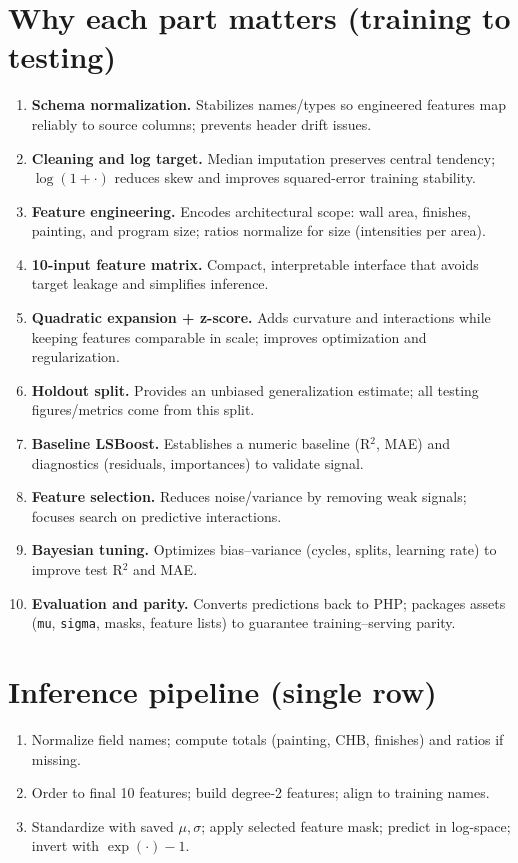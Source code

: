 \documentclass[11pt]{article}
\begin{document}
\section*{Why each part matters (training to testing)}
\begin{enumerate}[label=Part~\arabic*:, leftmargin=*]
  \item \textbf{Schema normalization.} Stabilizes names/types so engineered features map reliably to source columns; prevents header drift issues.
  \item \textbf{Cleaning and log target.} Median imputation preserves central tendency; $\log(1+\cdot)$ reduces skew and improves squared-error training stability.
  \item \textbf{Feature engineering.} Encodes architectural scope: wall area, finishes, painting, and program size; ratios normalize for size (intensities per area).
  \item \textbf{10-input feature matrix.} Compact, interpretable interface that avoids target leakage and simplifies inference.
  \item \textbf{Quadratic expansion + z-score.} Adds curvature and interactions while keeping features comparable in scale; improves optimization and regularization.
  \item \textbf{Holdout split.} Provides an unbiased generalization estimate; all testing figures/metrics come from this split.
  \item \textbf{Baseline LSBoost.} Establishes a numeric baseline (R$^2$, MAE) and diagnostics (residuals, importances) to validate signal.
  \item \textbf{Feature selection.} Reduces noise/variance by removing weak signals; focuses search on predictive interactions.
  \item \textbf{Bayesian tuning.} Optimizes bias–variance (cycles, splits, learning rate) to improve test R$^2$ and MAE.
  \item \textbf{Evaluation and parity.} Converts predictions back to PHP; packages assets (\verb|mu|, \verb|sigma|, masks, feature lists) to guarantee training–serving parity.
\end{enumerate}

\section*{Inference pipeline (single row)}
\begin{enumerate}
  \item Normalize field names; compute totals (painting, CHB, finishes) and ratios if missing.
  \item Order to final 10 features; build degree-2 features; align to training names.
  \item Standardize with saved $\mu,\sigma$; apply selected feature mask; predict in log-space; invert with $\exp(\cdot)-1$.
\end{enumerate}
\end{document}
